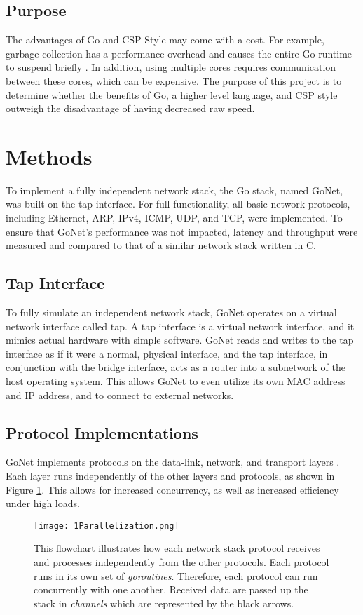 \documentclass[twocolumn,10pt]{article}
\begin{document}
\subsection{Purpose}
The advantages of Go and CSP Style may come with a cost. For example, garbage collection has a performance overhead and causes the entire Go runtime to suspend briefly \cite{GolangGCSTW}. In addition, using multiple cores requires communication between these cores, which can be expensive. The purpose of this project is to determine whether the benefits of Go, a higher level language, and CSP style outweigh the disadvantage of having decreased raw speed.

\section{Methods}
To implement a fully independent network stack, the Go stack, named GoNet, was built on the tap interface. For full functionality, all basic network protocols, including Ethernet, ARP, IPv4, ICMP, UDP, and TCP, were implemented. To ensure that GoNet's performance was not impacted, latency and throughput were measured and compared to that of a similar network stack written in C.

\subsection{Tap Interface}
To fully simulate an independent network stack, GoNet operates on a virtual network interface called tap. A tap interface is a virtual network interface, and it mimics actual hardware with simple software. GoNet reads and writes to the tap interface as if it were a normal, physical interface, and the tap interface, in conjunction with the bridge interface, acts as a router into a subnetwork of the host operating system. This allows GoNet to even utilize its own MAC address and IP address, and to connect to external networks.

\subsection{Protocol Implementations}
GoNet implements protocols on the data-link, network, and transport layers \cite{OSIRREFRFC}. Each layer runs independently of the other layers and protocols, as shown in Figure \ref{fig:parallelization}. This allows for increased concurrency, as well as increased efficiency under high loads. 

\begin{figure}
\begin{center}
  \texttt{[image: 1Parallelization.png]}
  \caption{This flowchart illustrates how each network stack protocol receives and processes independently from the other protocols. Each protocol runs in its own set of \textit{goroutines}. Therefore, each protocol can run concurrently with one another. Received data are passed up the stack in \textit{channels} which are represented by the black arrows.}
  \label{fig:parallelization}
\end{center}
\end{figure}
\end{document}
